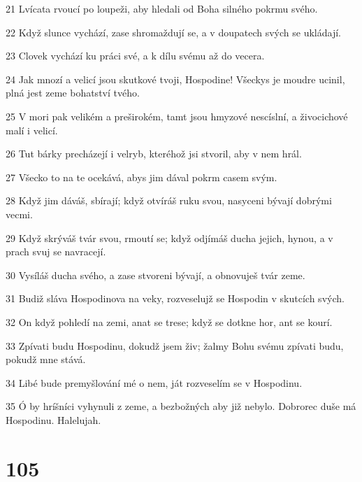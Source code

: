 \par 21 Lvícata rvoucí po loupeži, aby hledali od Boha silného pokrmu svého.
\par 22 Když slunce vychází, zase shromaždují se, a v doupatech svých se ukládají.
\par 23 Clovek vychází ku práci své, a k dílu svému až do vecera.
\par 24 Jak mnozí a velicí jsou skutkové tvoji, Hospodine! Všeckys je moudre ucinil, plná jest zeme bohatství tvého.
\par 25 V mori pak velikém a preširokém, tamt jsou hmyzové nescíslní, a živocichové malí i velicí.
\par 26 Tut bárky precházejí i velryb, kteréhož jsi stvoril, aby v nem hrál.
\par 27 Všecko to na te ocekává, abys jim dával pokrm casem svým.
\par 28 Když jim dáváš, sbírají; když otvíráš ruku svou, nasyceni bývají dobrými vecmi.
\par 29 Když skrýváš tvár svou, rmoutí se; když odjímáš ducha jejich, hynou, a v prach svuj se navracejí.
\par 30 Vysíláš ducha svého, a zase stvoreni bývají, a obnovuješ tvár zeme.
\par 31 Budiž sláva Hospodinova na veky, rozveselujž se Hospodin v skutcích svých.
\par 32 On když pohledí na zemi, anat se trese; když se dotkne hor, ant se kourí.
\par 33 Zpívati budu Hospodinu, dokudž jsem živ; žalmy Bohu svému zpívati budu, pokudž mne stává.
\par 34 Libé bude premyšlování mé o nem, ját rozveselím se v Hospodinu.
\par 35 Ó by hríšníci vyhynuli z zeme, a bezbožných aby již nebylo. Dobrorec duše má Hospodinu. Halelujah.

\chapter{105}

